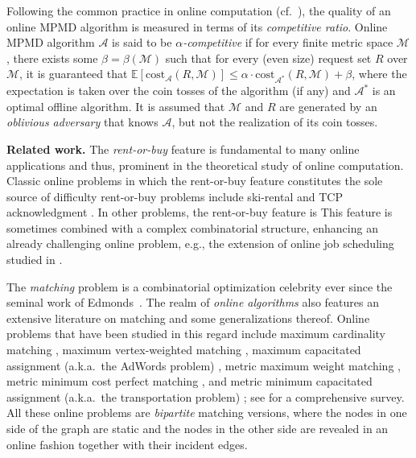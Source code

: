 \documentclass[11pt]{article}
\def\LongVersion{}
\def\LongVersionEnd{}
\def\ShortVersion{}
\def\ShortVersionEnd{}
\renewcommand{\paragraph}[1]{\par\noindent\textbf{#1}}
\theoremstyle{definition}
\theoremstyle{plain}
\theoremstyle{definition}
\theoremstyle{plain}
\theoremstyle{definition}
\theoremstyle{plain}
\newcommand{\Expect}{\mathbb{E}}
\newcommand{\Cost}{\mathrm{cost}}
\newcommand{\A}{\mathcal{A}}
\newcommand{\adv}[1]{{#1}^{*}}
\begin{document}
Following the common practice in online computation (cf.\ \cite{BorodinE1998}),
the quality of an online MPMD algorithm is measured in terms of its
\emph{competitive ratio}.
Online MPMD algorithm $\A$ is said to be \emph{$\alpha$-competitive} if for
every finite metric space $\mathcal{M}$, there exists some
$\beta = \beta(\mathcal{M})$
such that for every (even size) request set $R$ over $\mathcal{M}$, it
is guaranteed that
$\Expect[\Cost_{\A}(R, \mathcal{M})]
\leq
\alpha \cdot \Cost_{\adv{\A}}(R, \mathcal{M}) + \beta$,
where the expectation is taken over the coin tosses of the algorithm
(if any) and $\adv{\A}$ is an optimal offline algorithm.
It is assumed that $\mathcal{M}$ and $R$ are generated by an \emph{oblivious
adversary} that knows $\A$, but not the realization of its coin tosses.

\paragraph{Related work.}
The \emph{rent-or-buy} feature is fundamental to
\LongVersion %
many online applications and thus, prominent in the theoretical study of
\LongVersionEnd %
online computation.
Classic online
\LongVersion %
problems in which the rent-or-buy feature constitutes the
sole source of difficulty
\LongVersionEnd %
%
\ShortVersion %
rent-or-buy problems
\ShortVersionEnd %
include
ski-rental
\cite{KarlinMRS1986,KarlinMMLO1990,KarlinKR2001} and
TCP acknowledgment
\cite{DoolyGS1998,DoolyGS2001,KarlinKR2001}.
\LongVersion %
In other problems, the rent-or-buy feature is
\LongVersionEnd %
%
\ShortVersion %
This feature is sometimes
\ShortVersionEnd %
combined with a complex combinatorial structure, enhancing an already
challenging online problem, e.g., the extension of online job scheduling
\cite{AwerbuchKP1992,AwerbuchALR2002} studied in
\cite{AverbakhX2007,AverbakhB2013,AzarEJV2016}.

The \emph{matching} problem is a combinatorial optimization celebrity ever
since the seminal work of Edmonds~\cite{Edmonds1965a,Edmonds1965b}.
The realm of \emph{online algorithms} also features an extensive literature on
matching and some generalizations thereof.
Online problems that have been studied in this regard include
maximum cardinality matching
\cite{KarpVV1990,BirnbaumM2008,GoelM2008,DevanurJK2013,Miyazaki2014,NaorW2015},
maximum vertex-weighted matching
\cite{AggarwalGKM2011,DevanurJK2013,NaorW2015},
maximum capacitated assignment (a.k.a.\ the AdWords problem)
\cite{MehtaSVV2005,BuchbinderJN2007,GoelM2008,AggarwalGKM2011,NaorW2015},
metric maximum weight matching
\cite{KalyanasundaramP1993,KhullerMV1994},
metric minimum cost perfect matching
\cite{KalyanasundaramP1993,MeyersonNP2006,BansalBGN2014}, and
metric minimum capacitated assignment (a.k.a.\ the transportation
problem) \cite{KalyanasundaramP2000};
see \cite{Mehta2013} for a comprehensive survey.
All these online problems are \emph{bipartite} matching versions, where the
nodes in one side of the graph are static and the nodes in the other side are
revealed in an online fashion together with their incident edges.
\end{document}

